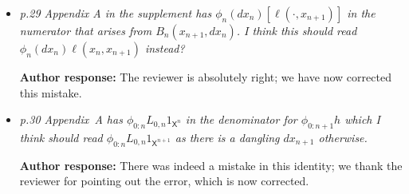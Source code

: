 \documentclass[11pt]{amsart}
\begin{document}
\begin{itemize}
\item {\em p.29 Appendix A in the supplement has $\phi_n(dx_n)[\ell(\cdot,x_{n+1})]$  in the numerator that arises from $B_n(x_{n+1},dx_n)$. I think this should read $\phi_n(dx_n)\ell(x_n,x_{n+1})$ instead?} \medskip

\textbf{Author response:} The reviewer is absolutely right; we have now corrected this mistake. \medskip

\item {\em p.30 Appendix~A has $\phi_{0:n}L_{0,n}1_{\mathsf{X}^n}$  in the denominator for  $\phi_{0:n+1}h$ which I think should read  $\phi_{0:n}L_{0,n}1_{\mathsf{X}^{n+1}}$ as there is a dangling $dx_{n+1}$ otherwise.} \medskip 

\textbf{Author response:} There was indeed a mistake in this identity; we thank the reviewer for pointing out the error, which is now corrected. 
\end{itemize}
\end{document}
